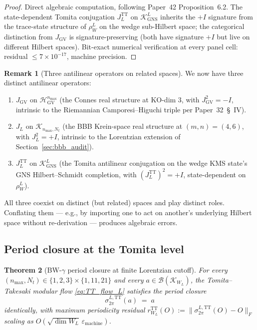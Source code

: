 \documentclass[11pt,a4paper]{article}
\theoremstyle{plain}
\newtheorem{theorem}{Theorem}[section]
\theoremstyle{definition}
\newtheorem{remark}[theorem]{Remark}
\newcommand{\nmax}{n_{\max}}
\newcommand{\Nt}{N_t}
\newcommand{\Hilb}{\mathcal{H}}
\newcommand{\Krein}{\mathcal{K}}
\newcommand{\Bcal}{\mathcal{B}}
\newcommand{\Frob}[1]{\lVert #1 \rVert_{F}}
\newcommand{\JL}{J_{L}}
\newcommand{\TT}{\mathrm{TT}}
\newcommand{\GNS}{\mathrm{GNS}}
\begin{document}
\begin{proof}
Direct algebraic computation, following Paper~42 Proposition~6.2. The
state-dependent Tomita conjugation $\JL^\TT$ on $\Krein_{\GNS}^L$
inherits the $+I$ signature from the trace-state structure of
$\rho_W^L$ on the wedge sub-Hilbert space; the categorical
distinction from $J_{\mathrm{GV}}$ is signature-preserving (both
have signature $+I$ but live on different Hilbert spaces). Bit-exact
numerical verification at every panel cell: residual
$\le 7 \times 10^{-17}$, machine precision.
\end{proof}

\begin{remark}[Three antilinear operators on related spaces]
\label{rem:three_J}
We now have three distinct antilinear operators:
\begin{enumerate}\setlength{\itemsep}{2pt}
\item $J_{\mathrm{GV}}$ on $\Hilb_{\mathrm{GV}}^{\nmax}$ (the Connes
real structure at KO-dim 3, with $J_{\mathrm{GV}}^2 = -I$, intrinsic to
the Riemannian Camporesi--Higuchi triple per Paper~32~\S~IV).
\item $\JL$ on $\Krein_{\nmax, \Nt}$ (the BBB Krein-space real
structure at $(m, n) = (4, 6)$, with $\JL^2 = +I$, intrinsic to the
Lorentzian extension of Section~\ref{sec:bbb_audit}).
\item $\JL^\TT$ on $\Krein_{\GNS}^L$ (the Tomita antilinear conjugation
on the wedge KMS state's GNS Hilbert--Schmidt completion, with
$(\JL^\TT)^2 = +I$, state-dependent on $\rho_W^L$).
\end{enumerate}
All three coexist on distinct (but related) spaces and play distinct
roles. Conflating them — e.g., by importing one to act on another's
underlying Hilbert space without re-derivation — produces algebraic
errors.
\end{remark}

\subsection{Period closure at the Tomita level}\label{sec:bw_gamma_closure}

\begin{theorem}[BW-$\gamma$ period closure at finite Lorentzian cutoff]
\label{thm:bw_gamma_lorentz}
For every $(\nmax, \Nt) \in \{1, 2, 3\} \times \{1, 11, 21\}$ and every
$a \in \Bcal(\Krein_{W_L})$, the Tomita--Takesaki modular flow
\eqref{eq:TT_flow_L} satisfies the period closure
\begin{equation}\label{eq:bw_gamma_closure_lorentz}
   \sigma_{2\pi}^{L, \TT}(a) \;=\; a
\end{equation}
identically, with maximum periodicity residual
$r_{W_L}^\TT(O) := \Frob{\sigma_{2\pi}^{L, \TT}(O) - O}$
scaling as $O(\sqrt{\dim W_L}\, \varepsilon_{\mathrm{machine}})$.
\end{theorem}
\end{document}
